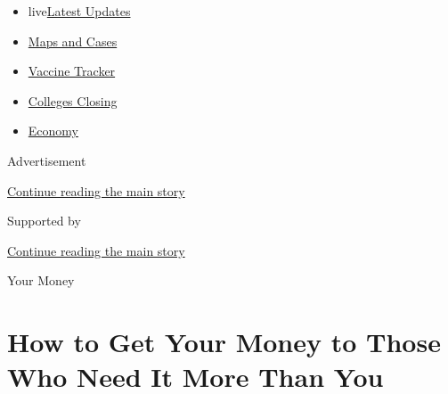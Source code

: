 \begin{itemize}
\tightlist
\item
  live\href{https://www.nytimes3xbfgragh.onion/2020/08/21/world/covid-19-coronavirus.html?name=styln-coronavirus-national\&region=TOP_BANNER\&variant=undefined\&block=storyline_menu_recirc\&action=click\&pgtype=Article\&impression_id=31015970-e3b1-11ea-881f-496d10ec9bb8}{Latest
  Updates}
\item
  \href{https://www.nytimes3xbfgragh.onion/interactive/2020/us/coronavirus-us-cases.html?name=styln-coronavirus-national\&region=TOP_BANNER\&variant=undefined\&block=storyline_menu_recirc\&action=click\&pgtype=Article\&impression_id=31015971-e3b1-11ea-881f-496d10ec9bb8}{Maps
  and Cases}
\item
  \href{https://www.nytimes3xbfgragh.onion/interactive/2020/science/coronavirus-vaccine-tracker.html?name=styln-coronavirus-national\&region=TOP_BANNER\&variant=undefined\&block=storyline_menu_recirc\&action=click\&pgtype=Article\&impression_id=31015972-e3b1-11ea-881f-496d10ec9bb8}{Vaccine
  Tracker}
\item
  \href{https://www.nytimes3xbfgragh.onion/2020/08/19/us/colleges-closing-covid.html?name=styln-coronavirus-national\&region=TOP_BANNER\&variant=undefined\&block=storyline_menu_recirc\&action=click\&pgtype=Article\&impression_id=31018080-e3b1-11ea-881f-496d10ec9bb8}{Colleges
  Closing}
\item
  \href{https://www.nytimes3xbfgragh.onion/live/2020/08/21/business/stock-market-today-coronavirus?name=styln-coronavirus-national\&region=TOP_BANNER\&variant=undefined\&block=storyline_menu_recirc\&action=click\&pgtype=Article\&impression_id=31018081-e3b1-11ea-881f-496d10ec9bb8}{Economy}
\end{itemize}

Advertisement

\protect\hyperlink{after-top}{Continue reading the main story}

Supported by

\protect\hyperlink{after-sponsor}{Continue reading the main story}

Your Money

\hypertarget{how-to-get-your-money-to-those-who-need-it-more-than-you}{%
\section{How to Get Your Money to Those Who Need It More Than
You}\label{how-to-get-your-money-to-those-who-need-it-more-than-you}}

